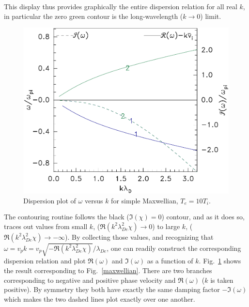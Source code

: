 \documentclass[12pt]{article}
\begin{document}
This display
thus provides graphically the entire dispersion relation for all real
$k$, in particular the zero green contour is the long-wavelength
($k\to 0$) limit.
\begin{figure}[htp]
  \centering
  \includegraphics[width=.5\hsize]{maxwelok}
  \caption{Dispersion plot of $\omega$ versus $k$ for simple
    Maxwellian, $T_e=10 T_i$.}
  \label{fig:maxwelok}
\end{figure}
The contouring routine follows the black ($\Im(\chi)=0$) contour, and
as it does so, traces out values from small $k$,
($\Re(k^2\lambda_{De}^2\chi)\to 0$) to large $k$,
($\Re(k^2\lambda_{De}^2\chi)\to-\infty$). By collecting those values,
and recognizing that
$\omega=v_pk=v_p\sqrt{-\Re(k^2\lambda_{De}^2\chi)}/\lambda_{De}$, one
can readily construct the corresponding dispersion relation and plot
$\Re(\omega)$ and $\Im(\omega)$ as a function of $k$. Fig.\
\ref{fig:maxwelok} shows the result corresponding to Fig.\
\ref{maxwellian}. There are two branches corresponding to negative and
positive phase velocity and $\Re(\omega)$ ($k$ is taken positive). By
symmetry they both have exactly the same damping factor $-\Im(\omega)$
which makes the two dashed lines plot exactly over one another.
\end{document}
